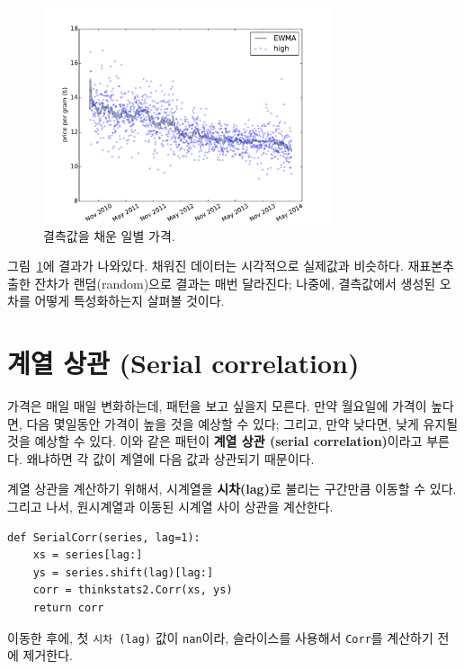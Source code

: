 \begin{figure}
\centerline{\includegraphics[height=2.5in]{figs/timeseries8.pdf}}
\caption{결측값을 채운 일별 가격.}
\label{timeseries8}
\end{figure}

그림~\ref{timeseries8}에 결과가 나와있다.
채워진 데이터는 시각적으로 실제값과 비슷하다.
재표본추출한 잔차가 랜덤(random)으로 결과는 매번 달라진다; 나중에,
결측값에서 생성된 오차를 어떻게 특성화하는지 살펴볼 것이다.



\section{계열 상관 (Serial correlation)}

가격은 매일 매일 변화하는데, 패턴을 보고 싶을지 모른다.
만약 월요일에 가격이 높다면, 다음 몇일동안 가격이 높을 것을 예상할 수 있다; 그리고, 만약 낮다면, 낮게 유지될 것을 예상할 수 있다.
이와 같은 패턴이 {\bf 계열 상관 (serial correlation)}이라고 부른다. 왜냐하면 각 값이 계열에 다음 값과 상관되기 때문이다.

계열 상관을 계산하기 위해서, 시계열을 {\bf 시차(lag)}로 불리는 구간만큼 이동할 수 있다. 그리고 나서, 원시계열과 이동된 시계열 사이 상관을 계산한다.

\begin{verbatim}
def SerialCorr(series, lag=1):
    xs = series[lag:]
    ys = series.shift(lag)[lag:]
    corr = thinkstats2.Corr(xs, ys)
    return corr
\end{verbatim}

이동한 후에, 첫 {\tt 시차 (lag)} 값이 {\tt nan}이라, 슬라이스를 사용해서 {\tt Corr}를 계산하기 전에 제거한다.

